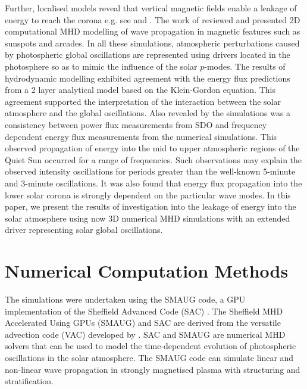 \documentclass[physics,article,submit,pdftex,moreauthors]{Definitions/mdpi}
\begin{document}
Further, localised models reveal that vertical magnetic fields enable a leakage of energy to reach the corona e.g. see  \cite{Khomenko2013} and  \cite{Santamaria2015}.   The work of \cite{Khomenko2013} \cite{Santamaria2015} reviewed and presented 2D computational MHD modelling of wave propagation in magnetic features such as sunspots and arcades.  In all these simulations, atmospheric perturbations caused by photospheric global oscillations are represented using drivers located in the photosphere so as to mimic the influence of the solar $p$-modes. The results of hydrodynamic modelling exhibited agreement  with the energy flux predictions from a 2 layer  analytical model based on the Klein-Gordon equation. This agreement supported the interpretation of the interaction between the solar atmosphere and the global oscillations. Also revealed by the simulations  was a consistency between power flux measurements from SDO and frequency dependent energy flux measurements from the numerical simulations. This observed propagation of energy into the mid to upper atmospheric regions of the Quiet Sun occurred for a range of frequencies. Such observations may explain the observed intensity oscillations for periods greater than the well-known 5-minute and 3-minute oscillations. It was also found that energy flux propagation into the lower solar corona is strongly dependent on the particular wave modes. In this paper, we present the results of investigation into the leakage of energy into the solar atmosphere using now 3D numerical MHD simulations with an extended driver representing solar global oscillations. 







\section{Numerical Computation Methods}


The simulations were undertaken using the SMAUG code, a GPU implementation of the Sheffield Advanced Code (SAC) \cite{Shelyag2008}. The Sheffield MHD Accelerated Using GPUs (SMAUG) \cite{Griffiths2015} and SAC  are derived from the versatile advection code (VAC) developed by \cite{Toth1996}. SAC and SMAUG are numerical MHD solvers  that can be used to model the time-dependent evolution of photospheric oscillations in the solar atmosphere. The SMAUG code can simulate linear and non-linear wave propagation in strongly magnetised plasma with structuring and stratification.
\end{document}
